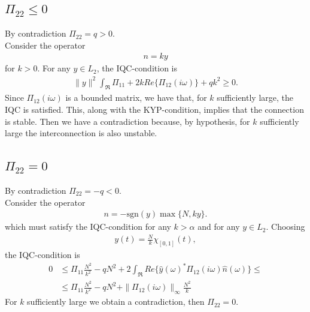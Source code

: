 \documentclass[a4paper,10pt]{article}
\newcommand{\w}{\omega}
\newcommand{\real}{Re}
\newcommand{\sgn}{\mathrm{sgn}}
\begin{document}
\subsection{$\Pi_{22} \leq 0$}
By contradiction $\Pi_{22}=q>0$.\\
Consider the operator
\begin{align}
	n=ky
\end{align}
for $k>0$.
For any $y\in L_2$, the IQC-condition is
\begin{align}
	\|y\|^2\int_{\Re} \Pi_{11} + 2k\real\{\Pi_{12}(i\w)\} +qk^2  \geq 0.
\end{align}
Since $\Pi_{12}(i\w)$ is a bounded matrix, we have that, for $k$ sufficiently large, the IQC is satisfied. This, along with the KYP-condition, implies that the connection is stable. Then we have a contradiction because, by hypothesis, for $k$ sufficiently large the interconnection is also unstable.\\


\subsection{$\Pi_{22} = 0$}
By contradiction $\Pi_{22}=-q<0$.\\
Consider the operator
\begin{align}
	n=-\sgn(y)\max\{N,ky\}.
\end{align}
which must satisfy the IQC-condition for any $k>\alpha$ and for any $y\in L_2$.
Choosing 
\begin{align}
	y(t)=\frac{N}{k}\chi_{[0,1]}(t),
\end{align} 
the IQC-condition is
\begin{align}
	0 &\leq \Pi_{11}\frac{N^2}{k^2}-qN^2+2\int_{\Re}
		\real\{\hat y(\w)^*\Pi_{12 }(i\w)\hat n(\w)\}\leq \\
	& \leq \Pi_{11}\frac{N^2}{k^2}-qN^2 +\|\Pi_{12}(i\w)\|_{\infty}\frac{N^2}{k}
\end{align}
For $k$ sufficiently large we obtain a contradiction, then $\Pi_{22}=0$. \\
\end{document}
